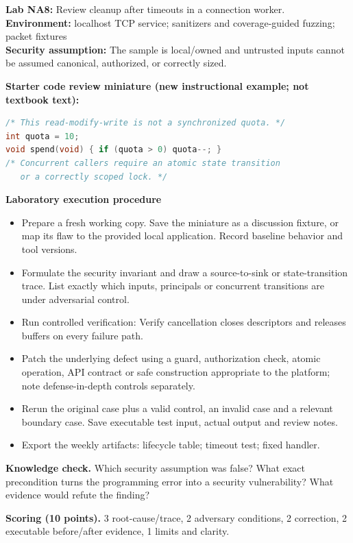 \documentclass[10pt,letterpaper]{article}
\begin{document}
\begin{insight}\textbf{Lab NA8:} Review cleanup after timeouts in a connection worker.\\\textbf{Environment:} localhost TCP service; sanitizers and coverage-guided fuzzing; packet fixtures\\\textbf{Security assumption:} The sample is local/owned and untrusted inputs cannot be assumed canonical, authorized, or correctly sized.\end{insight}
\textbf{Starter code review miniature (new instructional example; not textbook text):}
\begin{lstlisting}[language=C]
/* This read-modify-write is not a synchronized quota. */
int quota = 10;
void spend(void) { if (quota > 0) quota--; }
/* Concurrent callers require an atomic state transition
   or a correctly scoped lock. */
\end{lstlisting}
\textbf{Laboratory execution procedure}
\begin{itemize}[leftmargin=*,itemsep=2pt]
\item Prepare a fresh working copy. Save the miniature as a discussion fixture, or map its flaw to the provided local application. Record baseline behavior and tool versions.
\item Formulate the security invariant and draw a source-to-sink or state-transition trace. List exactly which inputs, principals or concurrent transitions are under adversarial control.
\item Run controlled verification: Verify cancellation closes descriptors and releases buffers on every failure path.
\item Patch the underlying defect using a guard, authorization check, atomic operation, API contract or safe construction appropriate to the platform; note defense-in-depth controls separately.
\item Rerun the original case plus a valid control, an invalid case and a relevant boundary case. Save executable test input, actual output and review notes.
\item Export the weekly artifacts: lifecycle table; timeout test; fixed handler.
\end{itemize}
\textbf{Knowledge check.} Which security assumption was false? What exact precondition turns the programming error into a security vulnerability? What evidence would refute the finding?

\textbf{Scoring (10 points).} 3 root-cause/trace, 2 adversary conditions, 2 correction, 2 executable before/after evidence, 1 limits and clarity.
\end{document}
